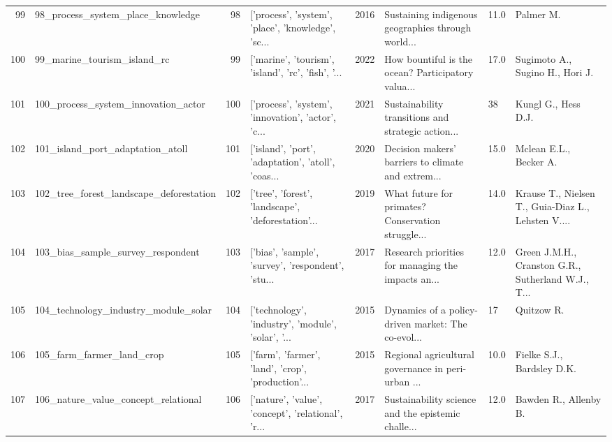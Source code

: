 \begin{tabular}{rlrlrlll}
         99 &                  98\_process\_system\_place\_knowledge &        98 & ['process', 'system', 'place', 'knowledge', 'sc... &          2016 & Sustaining indigenous geographies through world... &    11.0 &                                          Palmer M. \\
        100 &                        99\_marine\_tourism\_island\_rc &        99 & ['marine', 'tourism', 'island', 'rc', 'fish', '... &          2022 & How bountiful is the ocean? Participatory valua... &    17.0 &                    Sugimoto A., Sugino H., Hori J. \\
        101 &                100\_process\_system\_innovation\_actor &       100 & ['process', 'system', 'innovation', 'actor', 'c... &          2021 & Sustainability transitions and strategic action... &      38 &                                Kungl G., Hess D.J. \\
        102 &                   101\_island\_port\_adaptation\_atoll &       101 & ['island', 'port', 'adaptation', 'atoll', 'coas... &          2020 & Decision makers’ barriers to climate and extrem... &    15.0 &                             Mclean E.L., Becker A. \\
        103 &            102\_tree\_forest\_landscape\_deforestation &       102 & ['tree', 'forest', 'landscape', 'deforestation'... &          2019 & What future for primates? Conservation struggle... &    14.0 & Krause T., Nielsen T., Guia-Diaz L., Lehsten V.... \\
        104 &                  103\_bias\_sample\_survey\_respondent &       103 & ['bias', 'sample', 'survey', 'respondent', 'stu... &          2017 & Research priorities for managing the impacts an... &    12.0 & Green J.M.H., Cranston G.R., Sutherland W.J., T... \\
        105 &               104\_technology\_industry\_module\_solar &       104 & ['technology', 'industry', 'module', 'solar', '... &          2015 & Dynamics of a policy-driven market: The co-evol... &      17 &                                         Quitzow R. \\
        106 &                          105\_farm\_farmer\_land\_crop &       105 & ['farm', 'farmer', 'land', 'crop', 'production'... &          2015 & Regional agricultural governance in peri-urban ... &    10.0 &                         Fielke S.J., Bardsley D.K. \\
        107 &                106\_nature\_value\_concept\_relational &       106 & ['nature', 'value', 'concept', 'relational', 'r... &          2017 & Sustainability science and the epistemic challe... &    12.0 &                              Bawden R., Allenby B. \\

\end{tabular}
